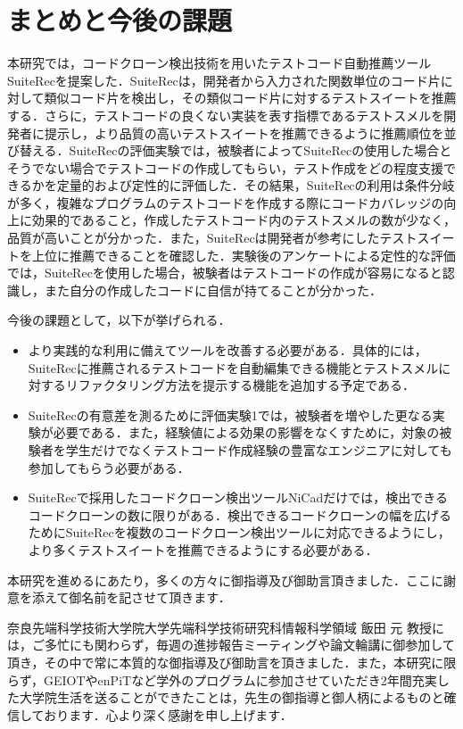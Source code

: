 \documentclass[12pt]{jarticle} %
\begin{document}
\section{まとめと今後の課題}
本研究では，コードクローン検出技術を用いたテストコード自動推薦ツール{\sf SuiteRec}を提案した．{\sf SuiteRec}は，開発者から入力された関数単位のコード片に対して類似コード片を検出し，その類似コード片に対するテストスイートを推薦する．さらに，テストコードの良くない実装を表す指標であるテストスメルを開発者に提示し，より品質の高いテストスイートを推薦できるように推薦順位を並び替える．{\sf SuiteRec}の評価実験では，被験者によって{\sf SuiteRec}の使用した場合とそうでない場合でテストコードの作成してもらい，テスト作成をどの程度支援できるかを定量的および定性的に評価した．その結果，{\sf SuiteRec}の利用は条件分岐が多く，複雑なプログラムのテストコードを作成する際にコードカバレッジの向上に効果的であること，作成したテストコード内のテストスメルの数が少なく，品質が高いことが分かった．また，{\sf SuiteRec}は開発者が参考にしたテストスイートを上位に推薦できることを確認した．実験後のアンケートによる定性的な評価では，{\sf SuiteRec}を使用した場合，被験者はテストコードの作成が容易になると認識し，また自分の作成したコードに自信が持てることが分かった．

今後の課題として，以下が挙げられる．

\begin{itemize}
\item より実践的な利用に備えてツールを改善する必要がある．具体的には，{\sf SuiteRec}に推薦されるテストコードを自動編集できる機能とテストスメルに対するリファクタリング方法を提示する機能を追加する予定である．
\item {\sf SuiteRec}の有意差を測るために評価実験1では，被験者を増やした更なる実験が必要である．また，経験値による効果の影響をなくすために，対象の被験者を学生だけでなくテストコード作成経験の豊富なエンジニアに対しても参加してもらう必要がある．
\item {\sf SuiteRec}で採用したコードクローン検出ツール{\sf NiCad}だけでは，検出できるコードクローンの数に限りがある．検出できるコードクローンの幅を広げるために{\sf SuiteRec}を複数のコードクローン検出ツールに対応できるようにし，より多くテストスイートを推薦できるようにする必要がある．
\end{itemize}


%
%
\acknowledgements

本研究を進めるにあたり，多くの方々に御指導及び御助言頂きました．ここに謝意を添えて御名前を記させて頂きます．

奈良先端科学技術大学院大学先端科学技術研究科情報科学領域 飯田 元 教授には，ご多忙にも関わらず，毎週の進捗報告ミーティングや論文輪講に御参加して頂き，その中で常に本質的な御指導及び御助言を頂きました．また，本研究に限らず，GEIOTやenPiTなど学外のプログラムに参加させていただき2年間充実した大学院生活を送ることができたことは，先生の御指導と御人柄によるものと確信しております．心より深く感謝を申し上げます．
\end{document}
